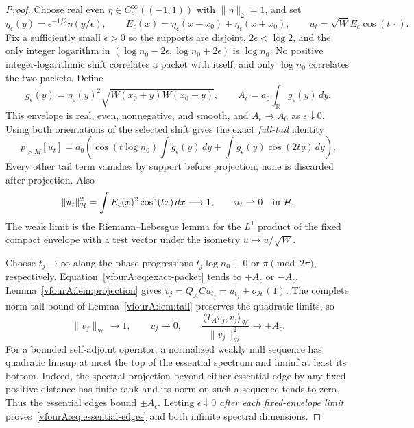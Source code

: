 \documentclass[11pt,a4paper]{article}
\numberwithin{equation}{section}
\theoremstyle{definition}\newtheorem{definition}[theorem]{Definition}
\theoremstyle{remark}\newtheorem{remark}[theorem]{Remark}
\newcommand{\R}{\mathbb R}\newcommand{\C}{\mathbb C}\newcommand{\N}{\mathbb N}
\newcommand{\Hh}{\mathcal H}\newcommand{\Hw}{\mathcal H}
\newcommand{\ip}[2]{\langle#1,#2\rangle}\newcommand{\norm}[1]{\lVert#1\rVert}\newcommand{\abs}[1]{\lvert#1\rvert}
\begin{document}
\begin{proof}
Choose real even $\eta\in C_c^\infty((-1,1))$ with $\norm\eta_2=1$,
and set
\[
 \eta_\epsilon(y)=\epsilon^{-1/2}\eta(y/\epsilon),\qquad
 E_\epsilon(x)=\eta_\epsilon(x-x_0)+\eta_\epsilon(x+x_0),\qquad
 u_t=\sqrt W E_\epsilon\cos(t\,\cdot).
\]
Fix a sufficiently small $\epsilon>0$ so the supports are disjoint,
$2\epsilon<\log2$, and the only integer logarithm in
$(\log n_0-2\epsilon,\log n_0+2\epsilon)$ is $\log n_0$.
No positive integer-logarithmic shift correlates a packet with
itself, and only $\log n_0$ correlates the two packets.  Define
\[
 g_\epsilon(y)=\eta_\epsilon(y)^2
           \sqrt{W(x_0+y)W(x_0-y)},\qquad
 A_\epsilon=a_0\int_\R g_\epsilon(y)\,dy.
\]
This envelope is real, even, nonnegative, and smooth, and
$A_\epsilon\to A_0$ as $\epsilon\downarrow0$.
Using both orientations of the selected shift gives the exact
\emph{full-tail} identity
\begin{equation}\label{vfourA:eq:exact-packet}
 p_{>M}[u_t]
 =a_0\left(\cos(t\log n_0)\int g_\epsilon(y)\,dy
       +\int g_\epsilon(y)\cos(2ty)\,dy\right).
\end{equation}
Every other tail term vanishes by support before projection; none
is discarded after projection.  Also
\begin{equation}\label{vfourA:eq:packet-weak}
 \norm{u_t}_{\Hh}^2
 =\int E_\epsilon(x)^2\cos^2(tx)\,dx\longrightarrow1,
 \qquad u_t\rightharpoonup0\quad\hbox{in }\Hh.
\end{equation}
The weak limit is the Riemann--Lebesgue lemma for the $L^1$ product
of the fixed compact envelope with a test vector under the isometry
$u\mapsto u/\sqrt W$.

Choose $t_j\to\infty$ along the phase progressions
$t_j\log n_0\equiv0$ or $\pi\pmod{2\pi}$, respectively.
Equation~\eqref{vfourA:eq:exact-packet} tends to $+A_\epsilon$ or
$-A_\epsilon$.  Lemma~\ref{vfourA:lem:projection} gives
$v_j=Q_ACu_{t_j}=u_{t_j}+o_{\Hh}(1)$.  The complete norm-tail bound
of Lemma~\ref{vfourA:lem:tail} preserves the quadratic limits, so
\[
 \norm{v_j}_{\Hh}\longrightarrow1,\qquad
 v_j\rightharpoonup0,\qquad
 \frac{\ip{T_Av_j}{v_j}_{\Hh}}{\norm{v_j}_{\Hh}^2}
 \longrightarrow\pm A_\epsilon.
\]
For a bounded self-adjoint operator, a normalized weakly null
sequence has quadratic limsup at most the top of the essential
spectrum and liminf at least its bottom.  Indeed, the spectral
projection beyond either essential edge by any fixed positive
distance has finite rank and its norm on such a sequence tends
to zero.  Thus the essential edges bound $\pm A_\epsilon$.
Letting $\epsilon\downarrow0$ \emph{after each fixed-envelope limit}
proves~\eqref{vfourA:eq:essential-edges} and both infinite spectral
dimensions.


\end{proof}
\end{document}
